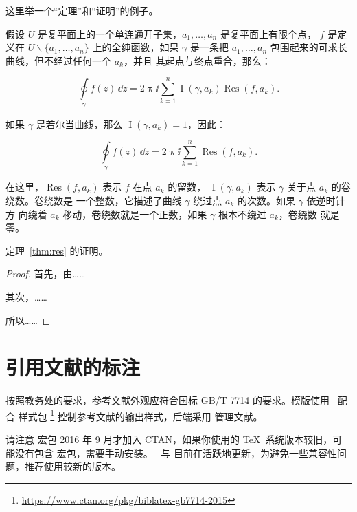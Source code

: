 这里举一个“定理”和“证明”的例子。
\begin{theorem}[留数定理]
\label{thm:res}
  假设 $U$ 是复平面上的一个单连通开子集，$a_1, \ldots, a_n$ 是复平面上有限个点，
  $f$ 是定义在 $U \backslash \{a_1, \ldots, a_n\}$ 上的全纯函数，如果 $\gamma$
  是一条把 $a_1, \ldots, a_n$ 包围起来的可求长曲线，但不经过任何一个 $a_k$，并且
  其起点与终点重合，那么：

  \begin{equation}
    \label{eq:res}
    \oint\limits_\gamma f(z)\, \dd z = 2\uppi \ii \sum_{k=1}^n \operatorname{I}(\gamma, a_k) \operatorname{Res}(f, a_k).
  \end{equation}

  如果 $\gamma$ 是若尔当曲线，那么 $\operatorname{I}(\gamma, a_k) = 1$，因此：

  \begin{equation}
    \label{eq:resthm}
    \oint\limits_\gamma f(z)\, \dd z = 2\uppi \ii \sum_{k=1}^n \operatorname{Res}(f, a_k).
  \end{equation}

  在这里，$\operatorname{Res}(f, a_k)$ 表示 $f$ 在点 $a_k$ 的留数，
  $\operatorname{I}(\gamma, a_k)$ 表示 $\gamma$ 关于点 $a_k$ 的卷绕数。卷绕数是
  一个整数，它描述了曲线 $\gamma$ 绕过点 $a_k$ 的次数。如果 $\gamma$ 依逆时针方
  向绕着 $a_k$ 移动，卷绕数就是一个正数，如果 $\gamma$ 根本不绕过 $a_k$，卷绕数
  就是零。

  定理~\ref{thm:res} 的证明。

  \begin{proof}
    首先，由……

    其次，……

    所以……
  \end{proof}
\end{theorem}

\section{引用文献的标注}

按照教务处的要求，参考文献外观应符合国标 GB/T 7714 的要求。模版使用 \BibLaTeX\
配合  样式包
\footnote{\url{https://www.ctan.org/pkg/biblatex-gb7714-2015}}
控制参考文献的输出样式，后端采用  管理文献。

请注意  宏包 2016 年 9 月才加入 CTAN，如果你使用的
\TeX\ 系统版本较旧，可能没有包含  宏包，需要手动安装。
\BibLaTeX\ 与 \pkg{biblatex-gb7714-2015} 目前在活跃地更新，为避免一些兼容性问
题，推荐使用较新的版本。

